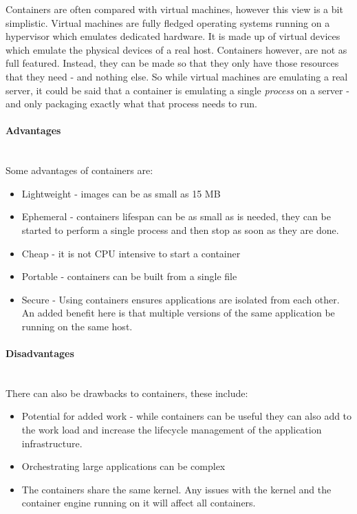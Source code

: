 \documentclass{article}
\begin{document}
Containers are often compared with virtual machines, however this view is a bit simplistic. Virtual machines are fully fledged operating systems running on a hypervisor which emulates dedicated hardware. It is made up of virtual devices which emulate the physical devices of a real host. Containers however, are not as full featured. Instead, they can be made so that they only have those resources that they need - and nothing else. So while virtual machines are emulating a real server, it could be said that a container is emulating a single \textit{process} on a server - and only packaging exactly what that process needs to run.


\paragraph{Advantages}\mbox{}\\

Some advantages of containers are:

\begin{itemize}
  \item Lightweight - images can be as small as 15 MB
  \item Ephemeral - containers lifespan can be as small as is needed, they can be started to perform a single process and then stop as soon as they are done. 
  \item Cheap - it is not CPU intensive to start a container
  \item Portable - containers can be built from a single file
  \item Secure - Using containers ensures applications are isolated from each other. An added benefit here is that multiple versions of the same application be running on the same host.
\end{itemize}

\paragraph{Disadvantages}\mbox{}\\

There can also be drawbacks to containers, these include:

\begin{itemize}
  \item Potential for added work - while containers can be useful they can also add to the work load and increase the lifecycle management of the application infrastructure.
  \item Orchestrating large applications can be complex
  \item The containers share the same kernel. Any issues with the kernel and the container engine running on it will affect all containers.
\end{itemize}
\end{document}
